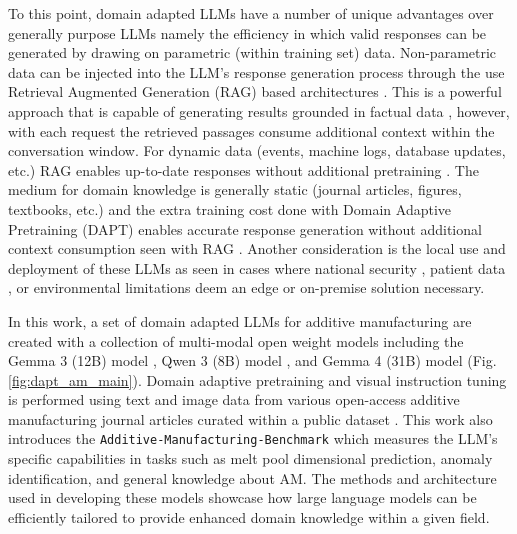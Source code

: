 To this point, domain adapted LLMs have a number of unique advantages over
generally purpose LLMs namely the efficiency in which valid responses can be
generated by drawing on parametric (within training set)
data\cite{gururangan_dont_2020, lu_fine-tuning_2025}. Non-parametric data can be
injected into the LLM's response generation process through the use Retrieval
Augmented Generation (RAG) based architectures
\cite{lewis_retrieval-augmented_2020}. This is a powerful approach that is
capable of generating results grounded in factual data
\cite{chandrasekhar_amgpt_2024, naghavi_khanghah_multimodal_2025}, however, with
each request the retrieved passages consume additional context within the
conversation window. For dynamic data (events, machine logs, database updates,
etc.) RAG enables up-to-date responses without additional pretraining
\cite{lewis_retrieval-augmented_2020}. The medium for domain knowledge is
generally static (journal articles, figures, textbooks, etc.) and the extra
training cost done with Domain Adaptive Pretraining (DAPT) enables accurate
response generation without additional context consumption seen with
RAG \cite{gururangan_dont_2020}. Another consideration is the local use and
deployment of these LLMs as seen in cases where national security
\cite{chen_survey_2025, caballero_large_2024}, patient data
\cite{montagna_privacy-preserving_2025, qu_novel_2024, tahera_sok_2026}, or
environmental limitations \cite{barkley_synthesizing_2026} deem an edge or
on-premise solution necessary.

In this work, a set of domain adapted LLMs for additive manufacturing are
created with a collection of multi-modal open weight models including the Gemma
3 (12B) model \cite{team_gemma_2025}, Qwen 3 (8B) model \cite{yang_qwen3_2025},
and Gemma 4 (31B) model (Fig. \ref{fig:dapt_am_main}). Domain adaptive
pretraining and visual instruction tuning is performed using text and image data
from various open-access additive manufacturing journal articles curated within
a public dataset \cite{peter_pak_additivellm2-oa_2026}. This work also
introduces the \texttt{Additive-\allowbreak Manufacturing-\allowbreak Benchmark}
which measures the LLM's specific capabilities in tasks such as melt pool
dimensional prediction, anomaly identification, and general knowledge about AM.
The methods and architecture used in developing these models showcase how large
language models can be efficiently tailored to provide enhanced domain knowledge
within a given field.

